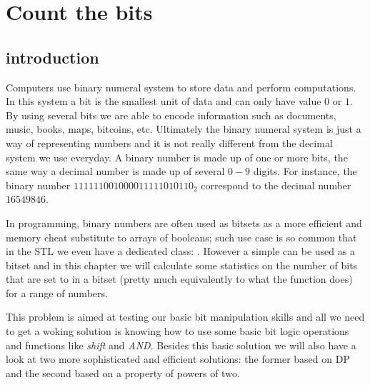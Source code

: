 %



\chapter{Count the bits}
\label{ch:count_bits}

\section*{introduction}
Computers use binary numeral system to store data and perform computations. In this system a bit
is the smallest unit of data and can only have value $0$ or $1$. By using several bits we are able to encode information such as documents,  music, books, maps, bitcoins, etc. Ultimately the binary numeral system is just a way of representing numbers and it is not really different from the decimal system we use everyday.
A binary number is made up of one or more bits, the same way a decimal number is made up of several $0-9$ digits. For instance, the binary number $111111001000011111010110_2$ correspond to the decimal number $16549846$.

In programming, binary numbers are often used as bitsets as a more efficient and memory cheat substitute to arrays of booleans; such use case is so common that in the \CC STL we even have a dedicated class: \href{https://en.cppreference.com/w/cpp/utility/bitset}{}. However a simple  can be used as a bitset and in this chapter we will calculate some statistics on the number of bits that are set to  in a bitset (pretty much equivalently to what the function \href{https://en.cppreference.com/w/cpp/numeric/popcount}{} does) for a range of numbers.

This problem is aimed at testing our basic bit manipulation skills and all we need to get a woking solution is knowing how to use some basic bit logic operations and functions like \textit{shift} and  \textit{AND}. Besides this basic solution we will also have a look at two more sophisticated and efficient solutions: the former based on DP and the second based on a property of powers of two. 



